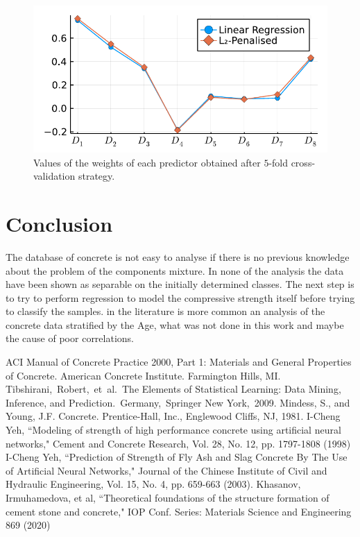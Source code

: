\documentclass[conference]{IEEEtran}
\begin{document}
\begin{figure}[htbp]
\centerline{\includegraphics[width=\columnwidth]{../figures/fitted_params_kfolds}}
\caption{Values of the weights of each predictor obtained after $5$-fold cross-validation strategy.}%
\end{figure}







\section{Conclusion}\label{conclusions}

The database of concrete is not easy to analyse if there is no previous knowledge about the problem of the components mixture. In none of the analysis the data have been shown as separable on the initially determined classes. The next step is to try to perform regression to model the compressive strength itself before trying to classify the samples. in the literature \cite{b6} is more common an analysis of the concrete data stratified by the Age, what was not done in this work and maybe the cause of poor correlations.

\begin{thebibliography}{00}
 ACI Manual of Concrete Practice 2000, Part 1: Materials and General Properties of Concrete.  American Concrete Institute.  Farmington Hills, MI.
 Tibshirani, Robert, et al. The Elements of  Statistical Learning:  Data Mining, Inference, and Prediction. Germany, Springer New York, 2009.
 Mindess, S., and Young, J.F. Concrete. Prentice-Hall, Inc., Englewood Cliffs, NJ, 1981.
 I-Cheng Yeh, ``Modeling of strength of high performance concrete using artificial neural networks," Cement and Concrete Research, Vol. 28, No. 12, pp. 1797-1808 (1998)
 I-Cheng Yeh, ``Prediction of Strength of Fly Ash and Slag Concrete By The Use of Artificial Neural Networks," Journal of the Chinese Institute of Civil and Hydraulic Engineering, Vol. 15, No. 4, pp. 659-663 (2003). 
 Khasanov, Irmuhamedova, et al, ``Theoretical foundations of the structure formation of cement stone
and concrete," IOP Conf. Series: Materials Science and Engineering 869 (2020)
\end{thebibliography}
\end{document}
